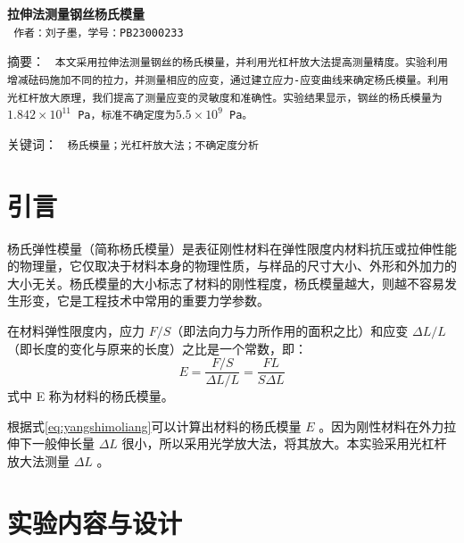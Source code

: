 \documentclass[a4paper]{extarticle}
\begin{document}
    \begin{center}
        \textbf{\fontsize{22pt}{\baselineskip} \selectfont 拉伸法测量钢丝杨氏模量}\\
        \vspace{2em}
        \texttt{\fontsize{14pt}{\baselineskip} \selectfont 作者：刘子墨，学号：PB23000233}\\
    \end{center}
    \vspace{2em}
    \hspace{2em}\textsf{\fontsize{9pt}{\baselineskip} \selectfont 摘要：}
    \texttt{\fontsize{9pt}{\baselineskip} \selectfont 本文采用拉伸法测量钢丝的杨氏模量，并利用光杠杆放大法提高测量精度。实验利用增减砝码施加不同的拉力，并测量相应的应变，通过建立应力-应变曲线来确定杨氏模量。利用光杠杆放大原理，我们提高了测量应变的灵敏度和准确性。实验结果显示，钢丝的杨氏模量为$1.842\times10^{11}$ Pa，标准不确定度为$5.5\times10^9$ Pa。}
    \par\hspace{2em}\textsf{\fontsize{9pt}{\baselineskip} \selectfont 关键词：}
    \texttt{\fontsize{9pt}{\baselineskip} \selectfont 杨氏模量；光杠杆放大法；不确定度分析}\\ 
    \section{引言}
    \hspace{2em}
    杨氏弹性模量（简称杨氏模量）是表征刚性材料在弹性限度内材料抗压或拉伸性能的物理量，它仅取决于材料本身的物理性质，与样品的尺寸大小、外形和外加力的大小无关。杨氏模量的大小标志了材料的刚性程度，杨氏模量越大，则越不容易发生形变，它是工程技术中常用的重要力学参数。
    \par\hspace{2em}
    在材料弹性限度内，应力 $F/S$（即法向力与力所作用的面积之比）和应变 $\Delta L/L$ （即长度的变化与原来的长度）之比是一个常数，即：
    \begin{equation}
        E=\frac{F/S}{\Delta L/L}=\frac{FL}{S\Delta L}
        \label{eq:yangshimoliang}
    \end{equation}
    式中 E 称为材料的杨氏模量。
    \par\hspace{2em}
    根据式\ref{eq:yangshimoliang}可以计算出材料的杨氏模量 $E$ 。因为刚性材料在外力拉伸下一般伸长量 $\Delta L$ 很小，所以采用光学放大法，将其放大。本实验采用光杠杆放大法测量 $\Delta L$ 。
    \section{实验内容与设计}
\end{document}
